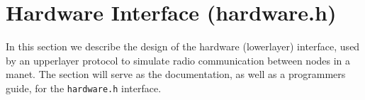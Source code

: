 \section{Hardware Interface (hardware.h)}\label{sec:hardwareinterface}
In this section we describe the design of the hardware (\gls{lowerlayer}) interface, used by an \gls{upperlayer} protocol to simulate radio communication between nodes in a \gls{manet}. The section will serve as the documentation, as well as a programmers guide, for the \texttt{hardware.h} interface.


